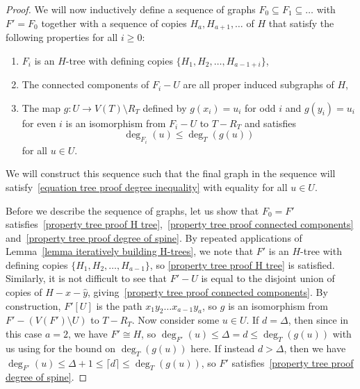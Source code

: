\documentclass[12pt,letterpaper]{article}
\theoremstyle{definition}
\begin{document}
\begin{proof}
		
		We will now inductively define a sequence of graphs $F_0\subseteq F_1\subseteq \dots$ with $F'=F_0$ 
		together with a sequence of copies $H_a,H_{a+1},\ldots$ of $H$ that satisfy the following properties for all $i\geq 0$:
		\begin{enumerate}[label=(T\arabic*)]
			\item $F_i$ is an $H$-tree with defining copies $\{H_1,H_2,\dots,H_{a-1+i}\}$,\label{property tree proof H tree}
			\item The connected components of $F_i-U$ are all proper induced subgraphs of $H$,\label{property tree proof connected components}
			\item The map $g:U\to V(T)\setminus R_T$ defined by $g(x_i)=u_i$ for odd $i$ and $g(y_i)=u_i$ for even $i$ is an isomorphism from $F_i-U$ to $T-R_T$ and satisfies
			\begin{equation}\label{equation tree proof degree inequality}
				\deg_{F_i}(u)\le \deg_T(g(u))
			\end{equation}
			for all $u\in U$.\label{property tree proof degree of spine}
		\end{enumerate}
		We will construct this sequence such that the final graph in the sequence will satisfy~\eqref{equation tree proof degree inequality} with equality for all $u\in U$.
		
		Before we describe the sequence of graphs, let us show that $F_0=F'$ satisfies~\ref{property tree proof H tree},~\ref{property tree proof connected components} and~\ref{property tree proof degree of spine}. By repeated applications of Lemma~\ref{lemma iteratively building H-trees}, we note that $F'$ is an $H$-tree with defining copies $\{H_1,H_2,\dots,H_{a-1}\}$, so \ref{property tree proof H tree} is satisfied. Similarly, it is not difficult to see that $F'-U$ is equal to the disjoint union of copies of $H-\hat{x}-\hat{y}$, giving~\ref{property tree proof connected components}. By construction, $F'[U]$ is the path $x_1y_2\dots x_{a-1}y_a$, so $g$ is an isomorphism from $F'-(V(F')\setminus U)$ to $T-R_T$.  Now consider some $u\in U$.  If $d=\Delta$, then since in this case $a=2$, we have $F'\cong H$, so  $\deg_{F'}(u)\leq \Delta=d\leq \deg_T(g(u))$ with us using  for the bound on $\deg_T(g(u))$ here.  If instead $d>\Delta$, then we have $\deg_{F'}(u)\leq \Delta+1\leq \lceil d\rceil\leq \deg_T(g(u))$, so $F'$ satisfies~\ref{property tree proof degree of spine}.
		

\end{proof}
\end{document}
